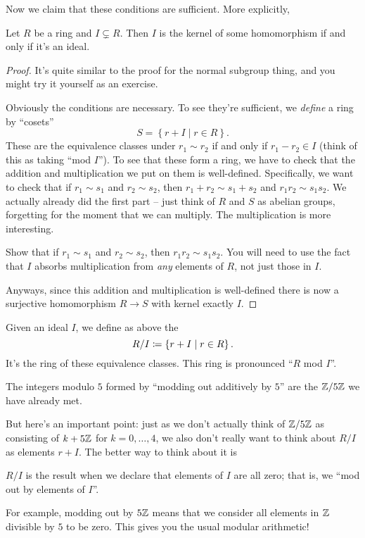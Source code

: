 Now we claim that these conditions are sufficient.
More explicitly,
\begin{theorem}
	Let $R$ be a ring and $I \subsetneq R$.
	Then $I$ is the kernel of some homomorphism if and only if it's an ideal.
\end{theorem}
\begin{proof}
	It's quite similar to the proof for the normal subgroup thing,
	and you might try it yourself as an exercise.

	Obviously the conditions are necessary.
	To see they're sufficient, we \emph{define} a ring by ``cosets''
	\[ S = \left\{ r + I \mid r \in R \right\}. \]
	These are the equivalence classes under $r_1 \sim r_2$ if and only if $r_1 - r_2 \in I$
	(think of this as taking ``mod $I$'').
	To see that these form a ring, we have to check that the addition
	and multiplication we put on them is well-defined.
	Specifically, we want to check that if $r_1 \sim s_1$ and $r_2 \sim s_2$,
	then $r_1 + r_2 \sim s_1 + s_2$ and $r_1r_2 \sim s_1s_2$.
	We actually already did the first part
	-- just think of $R$ and $S$ as abelian
	groups, forgetting for the moment that we can multiply.
	The multiplication is more interesting.
	\begin{exercise}
		[Recommended]
		Show that if $r_1 \sim s_1$ and $r_2 \sim s_2$, then $r_1r_2 \sim s_1s_2$.
		You will need to use the fact that $I$ absorbs multiplication
		from \emph{any} elements of $R$, not just those in $I$.
	\end{exercise}
	Anyways, since this addition and multiplication is well-defined there
	is now a surjective homomorphism $R \to S$ with kernel exactly $I$.
\end{proof}

\begin{definition}
	Given an ideal $I$, we define as above the 
	\[ R/I \coloneqq \left\{ r+I \mid r \in R \right\}. \]
	It's the ring of these equivalence classes.
	This ring is pronounced ``$R$ mod $I$''.
\end{definition}
\begin{example}[$\ZZ/5\ZZ$]
	The integers modulo $5$ formed by ``modding out additively by $5$''
	are the $\mathbb Z/5\mathbb Z$ we have already met.
\end{example}
But here's an important point:
just as we don't actually think of $\ZZ/5\ZZ$ as consisting of
$k + 5\mathbb Z$ for $k=0,\dots,4$,
we also don't really want to think about $R/I$ as elements $r+I$.
The better way to think about it is
\begin{moral}
	$R/I$ is the result when we declare that elements of $I$ are all zero;
	that is, we ``mod out by elements of $I$''.
\end{moral}
For example, modding out by $5\mathbb Z$ means that we consider
all elements in $\mathbb Z$ divisible by $5$ to be zero.
This gives you the usual modular arithmetic!

